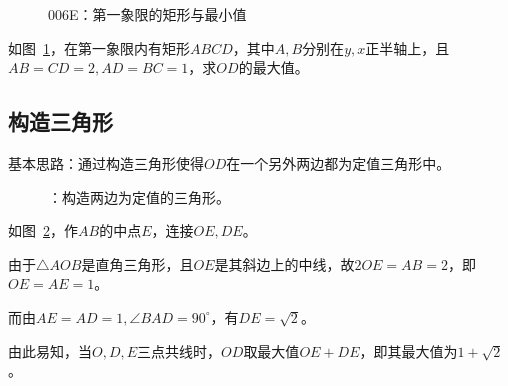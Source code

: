 

\begin{figure}[htbp]
  \centering
  \caption{006E：第一象限的矩形与最小值} \label{fig:006E}
\end{figure}

如图~\ref{fig:006E}，在第一象限内有矩形$ABCD$，其中$A, B$分别在$y, x$正半轴上，且$AB = CD = 2, AD = BC = 1$，求$OD$的最大值。


\subsection{构造三角形} \label{subsec:006E-tri}

基本思路：通过构造三角形使得$OD$在一个另外两边都为定值三角形中。

\begin{figure}[htbp]
  \centering
  \caption{：构造两边为定值的三角形。}
  \label{fig:006E-tri}
\end{figure}

如图~\ref{fig:006E-tri}，作$AB$的中点$E$，连接$OE, DE$。

由于$\triangle AOB$是直角三角形，且$OE$是其斜边上的中线，故$2OE = AB = 2$，即$OE = AE = 1$。

而由$AE = AD = 1, \angle BAD = 90^\circ$，有$DE = \sqrt2$。

由此易知，当$O, D, E$三点共线时，$OD$取最大值$OE + DE$，即其最大值为$1 + \sqrt2$。
